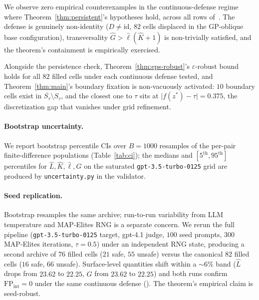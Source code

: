 \documentclass[11pt]{article}
\newcommand{\cl}[1]{\overline{#1}}
\begin{document}
\begin{table}[h]
\centering
\small
\caption{Resolution sweep for the oblique-smooth defense on
\texttt{gpt-3.5-turbo-0125} at progressively finer MAP-Elites
grid sizes. As $h = 1/N$ decreases, the discretization gap
$\lvert f(z^{*}) - \tau \rvert$ shrinks and $|\mathcal{S}_{\text{pred}}|$
grows; the theorem's containment holds across all
resolutions.}
\label{tab:resolution}

\end{table}

We observe zero empirical counterexamples in the
continuous-defense regime where Theorem~\ref{thm:persistent}'s
hypotheses hold, across all rows
of~.
The defense is genuinely non-identity ($D \neq \mathrm{id}$, $82$
cells displaced in the GP-oblique base configuration),
transversality $\hat G > \hat\ell(\hat K{+}1)$ is non-trivially
satisfied, and the theorem's containment is empirically
exercised.

Alongside the persistence check, Theorem~\ref{thm:eps-robust}'s
$\varepsilon$-robust bound holds for all $82$ filled cells under
each continuous defense tested, and Theorem~\ref{thm:main}'s
boundary fixation is non-vacuously activated: $10$ boundary cells
exist in $\cl{S_\tau} \setminus S_\tau$, and the closest one to
$\tau$ sits at $\lvert f(z^{*}) - \tau \rvert = 0.375$, the
discretization gap that vanishes under grid refinement.

\paragraph{Bootstrap uncertainty.}
We report bootstrap percentile CIs over $B = 1000$ resamples of
the per-pair finite-difference populations
(Table~\ref{tab:ci}); the medians and
$[5^{\text{th}}, 95^{\text{th}}]$ percentiles for
$\hat L, \hat K, \hat\ell, \hat G$ on the saturated
\texttt{gpt-3.5-turbo-0125} grid are produced by
\texttt{uncertainty.py} in the validator.

\paragraph{Seed replication.}
Bootstrap resamples the same archive; run-to-run variability from
LLM temperature and MAP-Elites RNG is a separate concern. We rerun
the full pipeline (\texttt{gpt-3.5-turbo-0125} target, gpt-4.1 judge,
$100$ seed prompts, $300$ MAP-Elites iterations, $\tau{=}0.5$) under
an independent RNG state, producing a second archive of $76$ filled
cells ($21$ safe, $55$ unsafe) versus the canonical $82$ filled cells
($16$ safe, $66$ unsafe). Surface-level quantities shift within a
$\sim6\%$ band ($\hat L$ drops from $23.62$ to $22.25$, $\hat G$ from
$23.62$ to $22.25$) and both runs confirm
$\mathrm{FP}_{\mathrm{int}} = 0$ under the same continuous defense
(). The theorem's empirical claim is
seed-robust.
\end{document}
